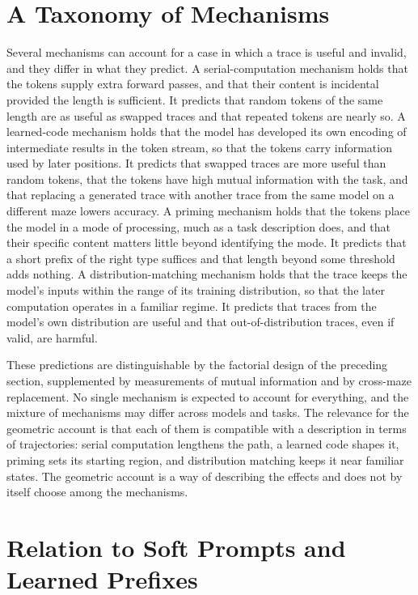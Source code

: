 \section{A Taxonomy of Mechanisms}

Several mechanisms can account for a case in which a trace is useful and invalid, and they differ in what they predict. A serial-computation mechanism holds that the tokens supply extra forward passes, and that their content is incidental provided the length is sufficient. It predicts that random tokens of the same length are as useful as swapped traces and that repeated tokens are nearly so. A learned-code mechanism holds that the model has developed its own encoding of intermediate results in the token stream, so that the tokens carry information used by later positions. It predicts that swapped traces are more useful than random tokens, that the tokens have high mutual information with the task, and that replacing a generated trace with another trace from the same model on a different maze lowers accuracy. A priming mechanism holds that the tokens place the model in a mode of processing, much as a task description does, and that their specific content matters little beyond identifying the mode. It predicts that a short prefix of the right type suffices and that length beyond some threshold adds nothing. A distribution-matching mechanism holds that the trace keeps the model's inputs within the range of its training distribution, so that the later computation operates in a familiar regime. It predicts that traces from the model's own distribution are useful and that out-of-distribution traces, even if valid, are harmful.

These predictions are distinguishable by the factorial design of the preceding section, supplemented by measurements of mutual information and by cross-maze replacement. No single mechanism is expected to account for everything, and the mixture of mechanisms may differ across models and tasks. The relevance for the geometric account is that each of them is compatible with a description in terms of trajectories: serial computation lengthens the path, a learned code shapes it, priming sets its starting region, and distribution matching keeps it near familiar states. The geometric account is a way of describing the effects and does not by itself choose among the mechanisms.

\section{Relation to Soft Prompts and Learned Prefixes}

